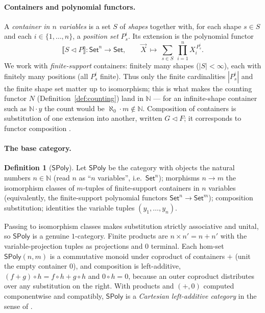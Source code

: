 \documentclass[11pt]{article}
\theoremstyle{definition}
\newtheorem{definition}[theorem]{Definition}
\newcommand{\SPoly}{\mathsf{SPoly}}
\newcommand{\Set}{\mathsf{Set}}
\newcommand{\N}{\mathbb{N}}
\newcommand{\sem}[1]{\llbracket #1 \rrbracket}
\begin{document}
\paragraph{Containers and polynomial functors.}
A \emph{container in $n$ variables} is a set $S$ of \emph{shapes} together with, for each shape
$s\in S$ and each $i\in\{1,\dots,n\}$, a \emph{position set} $P^i_s$. Its extension is the
polynomial functor
\[
  \sem{S\lhd P}\colon\Set^n\to\Set,\qquad
  \vec X\ \longmapsto\ \sum_{s\in S}\ \prod_{i=1}^{n} X_i^{\,P^i_s}.
\]
We work with \emph{finite-support} containers: finitely many shapes ($|S|<\infty$), each with
finitely many positions (all $P^i_s$ finite). Thus only the finite cardinalities $|P^i_s|$ and the
finite shape set matter up to isomorphism; this is what makes the counting functor $N$
(Definition~\ref{def:counting}) land in $\N$ --- for an infinite-shape container such as $\N\cdot y$
the count would be $\aleph_0\cdot m\notin\N$. Composition of containers is substitution of one
extension into another, written $G\lhd F$; it corresponds to functor composition \cite{AAGM2003}.

\paragraph{The base category.}
\begin{definition}[$\SPoly$]\label{def:spoly}
Let $\SPoly$ be the category with objects the natural numbers $n\in\N$ (read $n$ as ``$n$
variables'', i.e.\ $\Set^n$); morphisms $n\to m$ the isomorphism classes of $m$-tuples of
finite-support containers in $n$ variables (equivalently, the finite-support polynomial functors
$\Set^n\to\Set^m$); composition substitution; identities the variable tuples $(y_1,\dots,y_n)$.
\end{definition}

Passing to isomorphism classes makes substitution strictly associative and unital, so $\SPoly$ is a
genuine $1$-category. Finite products are $n\times n'=n+n'$ with the variable-projection tuples as
projections and $0$ terminal. Each hom-set $\SPoly(n,m)$ is a commutative monoid under coproduct of
containers $+$ (unit the empty container $0$), and composition is left-additive,
$(f+g)\circ h=f\circ h+g\circ h$ and $0\circ h=0$, because an outer coproduct distributes over any
substitution on the right. With products and $(+,0)$ computed componentwise and compatibly, $\SPoly$
is a \emph{Cartesian left-additive category} in the sense of \cite[Def.~1.2.1]{BCS2009}.
\end{document}
